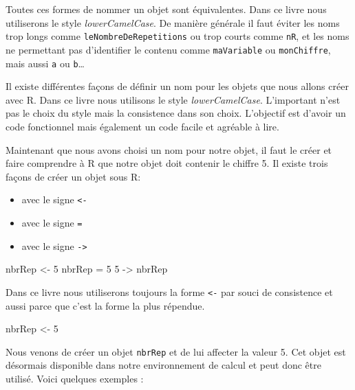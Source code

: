 \documentclass[]{book}
\newenvironment{Shaded}{\begin{snugshade}}{\end{snugshade}}
\newcommand{\DecValTok}[1]{\textcolor[rgb]{0.00,0.00,0.81}{#1}}
\newcommand{\StringTok}[1]{\textcolor[rgb]{0.31,0.60,0.02}{#1}}
\newcommand{\NormalTok}[1]{#1}
\providecommand{\tightlist}{%
  \setlength{\itemsep}{0pt}\setlength{\parskip}{0pt}}
\theoremstyle{definition}
\theoremstyle{definition}
\theoremstyle{definition}
\theoremstyle{remark}
\begin{document}
Toutes ces formes de nommer un objet sont équivalentes. Dans ce livre
nous utiliserons le style \emph{lowerCamelCase}. De manière générale il
faut éviter les noms trop longs comme \texttt{leNombreDeRepetitions} ou
trop courts comme \texttt{nR}, et les noms ne permettant pas
d'identifier le contenu comme \texttt{maVariable} ou
\texttt{monChiffre}, mais aussi \texttt{a} ou \texttt{b}\ldots{}

Il existe différentes façons de définir un nom pour les objets que nous
allons créer avec R. Dans ce livre nous utilisons le style
\emph{lowerCamelCase}. L'important n'est pas le choix du style mais la
consistence dans son choix. L'objectif est d'avoir un code fonctionnel
mais également un code facile et agréable à lire.

Maintenant que nous avons choisi un nom pour notre objet, il faut le
créer et faire comprendre à R que notre objet doit contenir le chiffre
5. Il existe trois façons de créer un objet sous R:

\begin{itemize}
\tightlist
\item
  avec le signe \texttt{\textless{}-}
\item
  avec le signe \texttt{=}
\item
  avec le signe \texttt{-\textgreater{}}
\end{itemize}

\begin{Shaded}
\begin{Highlighting}[]
\NormalTok{nbrRep <-}\StringTok{ }\DecValTok{5}
\NormalTok{nbrRep =}\StringTok{ }\DecValTok{5}
\DecValTok{5}\NormalTok{ ->}\StringTok{ }\NormalTok{nbrRep}
\end{Highlighting}
\end{Shaded}

Dans ce livre nous utiliserons toujours la forme \texttt{\textless{}-}
par souci de consistence et aussi parce que c'est la forme la plus
répendue.

\begin{Shaded}
\begin{Highlighting}[]
\NormalTok{nbrRep <-}\StringTok{ }\DecValTok{5}
\end{Highlighting}
\end{Shaded}

Nous venons de créer un objet \texttt{nbrRep} et de lui affecter la
valeur 5. Cet objet est désormais disponible dans notre environnement de
calcul et peut donc être utilisé. Voici quelques exemples :
\end{document}
